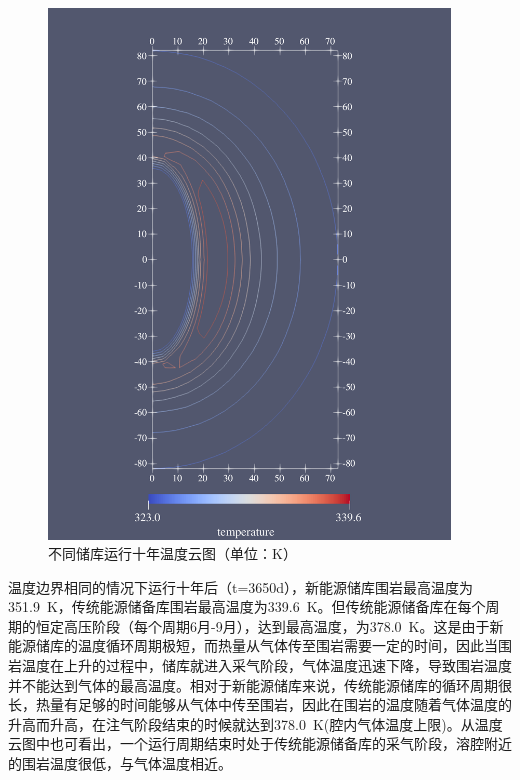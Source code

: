 \begin{figure}[ht!]
{\begin{minipage}{7cm}
            \includegraphics[width=0.95\textwidth]{img/chap5/温度/传统能源储库等温线.pdf}
        \end{minipage}
    }
    \caption{不同储库运行十年温度云图（单位：\si{K}）}
    \label{fig:5_21}
\end{figure}




温度边界相同的情况下运行十年后（t=3650d），新能源储库围岩最高温度为\SI{351.9}{K}，传统能源储备库围岩最高温度为\SI{339.6}{K}。但传统能源储备库在每个周期的恒定高压阶段（每个周期6月-9月），达到最高温度，为\SI{378.0}{K}。这是由于新能源储库的温度循环周期极短，而热量从气体传至围岩需要一定的时间，因此当围岩温度在上升的过程中，储库就进入采气阶段，气体温度迅速下降，导致围岩温度并不能达到气体的最高温度。相对于新能源储库来说，传统能源储库的循环周期很长，热量有足够的时间能够从气体中传至围岩，因此在围岩的温度随着气体温度的升高而升高，在注气阶段结束的时候就达到\SI{378.0}{K}(腔内气体温度上限)。从温度云图中也可看出，一个运行周期结束时处于传统能源储备库的采气阶段，溶腔附近的围岩温度很低，与气体温度相近。

